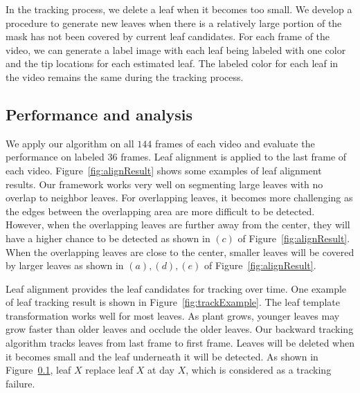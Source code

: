 In the tracking process, we delete a leaf when it becomes too small.
We develop a procedure to generate new leaves when there is a relatively large portion of the mask has not been covered by current leaf candidates.
For each frame of the video, we can generate a label image with each leaf being labeled with one color and the tip locations for each estimated leaf.
The labeled color for each leaf in the video remains the same during the tracking process.



\subsection{Performance and analysis}
We apply our algorithm on all $144$ frames of each video and evaluate the performance on labeled $36$ frames.
Leaf alignment is applied to the last frame of each video.
Figure~\ref{fig:alignResult} shows some examples of leaf alignment results.
Our framework works very well on segmenting large leaves with no overlap to neighbor leaves.
For overlapping leaves, it becomes more challenging as the edges between the overlapping area are more difficult to be detected.
However, when the overlapping leaves are further away from the center, they will have a higher chance to be detected as shown in $(c)$ of Figure~\ref{fig:alignResult}.
When the overlapping leaves are close to the center, smaller leaves will be covered by larger leaves as shown in $(a), (d), (e)$ of Figure~\ref{fig:alignResult}.


Leaf alignment provides the leaf candidates for tracking over time.
One example of leaf tracking result is shown in Figure~\ref{fig:trackExample}.
The leaf template transformation works well for most leaves.
As plant grows, younger leaves may grow faster than older leaves and occlude the older leaves.
Our backward tracking algorithm tracks leaves from last frame to first frame.
Leaves will be deleted when it becomes small and the leaf underneath it will be detected.
As shown in Figure~\ref{}, leaf $X$ replace leaf $X$ at day $X$, which is considered as a tracking failure.




